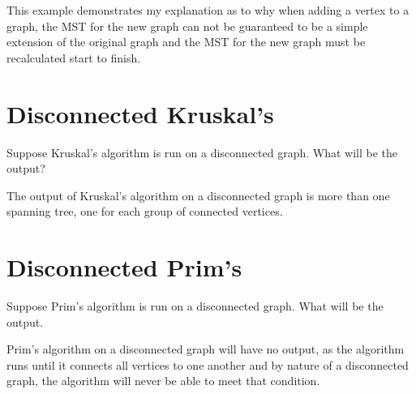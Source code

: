 \documentclass[11pt]{article}
\begin{document}
This example demonstrates my explanation as to why when adding a vertex to a graph, the MST for the new graph can not be guaranteed to be a simple extension of the original graph and the MST for the new graph must be recalculated start to finish.

\bigskip
\bigskip

\section{Disconnected Kruskal's} %
Suppose Kruskal's algorithm is run on a disconnected graph. What will be the output?

\bigskip
\bigskip

The output of Kruskal's algorithm on a disconnected graph is more than one spanning tree, one for each group of connected vertices.

\section{Disconnected Prim's} %
Suppose Prim's algorithm is run on a disconnected graph. What will be the output.

\bigskip
\bigskip

Prim's algorithm on a disconnected graph will have no output, as the algorithm runs until it connects all vertices to one another and by nature of a disconnected graph, the algorithm will never be able to meet that condition.



















\end{document}

